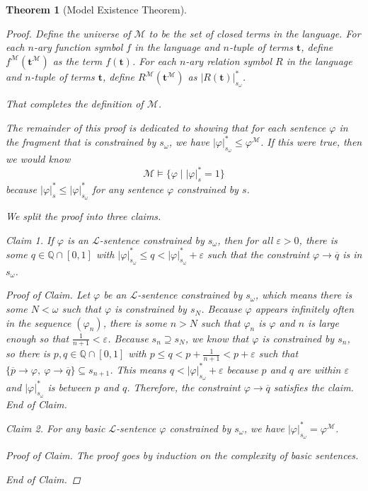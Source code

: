 \documentclass{amsart}
\newtheorem{theorem}{Theorem}[section]
\theoremstyle{definition}
\numberwithin{equation}{theorem}
\renewcommand{\phi}{\varphi}
\renewcommand{\epsilon}{\varepsilon}
\newcommand{\Q}{\mathbb{Q}}
\newcommand{\V}{\mathbf}
\newcommand{\where}{\mid}
\newcommand{\rat}[1]{{\overline{#1}}}
\newcommand{\narrow}[1]{\xrightarrow{#1}}
\renewcommand{\to}{\narrow{}}
\newenvironment{claim}[1]{\vspace{.07in}\par\noindent\emph{Claim #1.}\space}{}
\newenvironment{claimproof}{\vspace{.07in}\par\noindent\emph{Proof of Claim.}\space}{\hfill \emph{End of Claim.}}
\begin{document}
\begin{theorem}[Model Existence Theorem]
\begin{proof}
    Define the universe of $\mathcal M$ to be the set of closed terms in the language.
    For each $n$-ary function symbol $f$ in the language and $n$-tuple of terms $\V t$, define $f^\mathcal M(\V t^\mathcal M)$ as the term $f(\V t)$.
    For each $n$-ary relation symbol $R$ in the language and $n$-tuple of terms $\V t$, define $R^\mathcal M(\V t^\mathcal M)$ as $|R(\V t)|^*_{s_\omega}$.
    
    That completes the definition of $\mathcal M$.
    
    The remainder of this proof is dedicated to showing that for each sentence $\phi$ in the fragment that is constrained by $s_\omega$, we have $|\phi|^*_{s_\omega}\leq\phi^\mathcal M$.
    If this were true, then we would know
    \[
      \mathcal M\models\{\phi\where |\phi|^*_s=1\}
    \]
    because $|\phi|^*_s\leq|\phi|^*_{s_\omega}$ for any sentence $\phi$ constrained by $s$.
    
    We split the proof into three claims.
	  \begin{claim}{1}
	  If $\phi$ is an $\mathcal L$-sentence constrained by $s_\omega$, then for all $\epsilon>0$, there is some $q\in\Q\cap[0,1]$ with $|\phi|^*_{s_\omega}\leq q<|\phi|^*_{s_\omega}+\epsilon$ such that the constraint $\phi\to\rat q$ is in $s_\omega$.
	  \begin{claimproof}
	    Let $\phi$ be an $\mathcal L$-sentence constrained by $s_\omega$, which means there is some $N<\omega$ such that $\phi$ is constrained by $s_N$.
	    Because $\phi$ appears infinitely often in the sequence $(\phi_n)$, there is some $n>N$ such that $\phi_n$ is $\phi$ and $n$ is large enough so that $\tfrac1{n+1}<\epsilon$.
	    Because $s_n\supseteq s_N$, we know that $\phi$ is constrained by $s_n$, so there is $p,q\in\Q\cap[0,1]$ with $p\leq q<p+\tfrac1{n+1}<p+\epsilon$ such that $\{\rat p\to\phi,\ \phi\to\rat q\}\subseteq s_{n+1}$.
	    This means $q<|\phi|^*_{s_\omega}+\epsilon$ because $p$ and $q$ are within $\epsilon$ and $|\phi|^*_{s_\omega}$ is between $p$ and $q$.
	    Therefore, the constraint $\phi\to\rat q$ satisfies the claim.
	  \end{claimproof}
	  \end{claim}
    \begin{claim}{2}
      For any basic $\mathcal L$-sentence $\phi$ constrained by $s_\omega$, we have $|\phi|^*_{s_\omega}=\phi^\mathcal M$.
      \begin{claimproof}
        The proof goes by induction on the complexity of basic sentences.
        

\end{claimproof}
\end{claim}
\end{proof}
\end{theorem}
\end{document}
